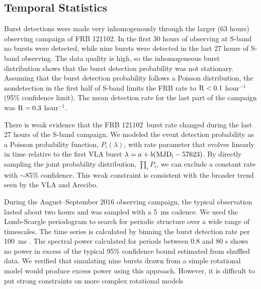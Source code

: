 \documentclass[twocolumn]{aastex61}
\newcommand{\frb}{FRB 121102}
\begin{document}
\subsection{Temporal Statistics}
\label{sec:temp}
Burst detections were made very inhomogenously through the larger (63 hours) observing campaign of FRB 121102. In the first 30 hours of observing at S-band no bursts were detected, while nine bursts were detected in the last 27 hours of S-band observing. The data quality is high, so the inhomogeneous burst distribution shows that the burst detection probability was not stationary. Assuming that the burst detection probability follows a Poisson distribution, the nondetection in the first half of S-band limits the FRB rate to $\rm{R}<0.1$ hour$^{-1}$ (95\% confidence limit). The mean detection rate for the last part of the campaign was $\rm{R}=0.3$ hour$^{-1}$.

There is weak evidence that the \frb\ burst rate changed during the last 27 hours of the S-band campaign. We modeled the event detection probability as a Poisson probability function, $P_i(\lambda)$, with rate parameter that evolves linearly in time relative to the first VLA burst $\lambda = a + b (\rm{MJD}_i - 57623)$. By directly sampling the joint probability distribution, $\prod_{i} P_i$, we can exclude a constant rate with $\sim$85\% confidence. This weak constraint is consistent with the broader trend seen by the VLA and Arecibo.


During the August--September 2016 observing campaign, the typical observation lasted about two hours and was sampled with a 5~ms cadence. We used the Lomb-Scargle periodogram \citep{1982ApJ...263..835S} to search for periodic structure over a wide range of timescales. The time series is calculated by binning the burst detection rate per 100~ms \citep[always either 0 or 1, see also]{2011MNRAS.417.1871P}. 
The spectral power calculated for periods between 0.8 and 80 s shows no power in excess of the typical 95\% confidence bound estimated from shuffled data. We verified that simulating nine bursts drawn from a simple rotational model would produce excess power using this approach. However, it is difficult to put strong constraints on more complex rotational models \citep[e.g., with wide pulse phase windows or glitches][]{2007ApJ...663..497C, 2013Natur.497..591A}
\end{document}
